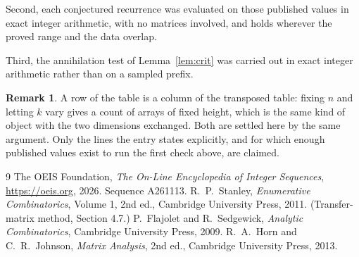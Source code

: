 \documentclass[11pt,a4paper]{article}
\theoremstyle{plain}
\theoremstyle{definition}
\newtheorem{remark}[theorem]{Remark}
\begin{document}
Second, each conjectured recurrence was evaluated on those published values in exact
integer arithmetic, with no matrices involved, and holds wherever the proved range and the
data overlap.

Third, the annihilation test of Lemma~\ref{lem:crit} was carried out in exact integer
arithmetic rather than on a sampled prefix.

\begin{remark}
A row of the table is a column of the transposed table: fixing $n$ and letting $k$ vary gives a
count of arrays of fixed height, which is the same kind of object with the two dimensions
exchanged. Both are settled here by the same argument. Only the lines the entry states
explicitly, and for which enough published values exist to run the first check above, are
claimed.
\end{remark}

\begin{thebibliography}{9}
 The OEIS Foundation, \emph{The On-Line Encyclopedia of Integer
Sequences}, \url{https://oeis.org}, 2026. Sequence A261113.
 R.~P.~Stanley, \emph{Enumerative Combinatorics}, Volume 1, 2nd ed.,
Cambridge University Press, 2011. (Transfer-matrix method, Section 4.7.)
 P.~Flajolet and R.~Sedgewick, \emph{Analytic Combinatorics}, Cambridge
University Press, 2009.
 R.~A.~Horn and C.~R.~Johnson, \emph{Matrix Analysis}, 2nd ed., Cambridge
University Press, 2013.
\end{thebibliography}
\end{document}
